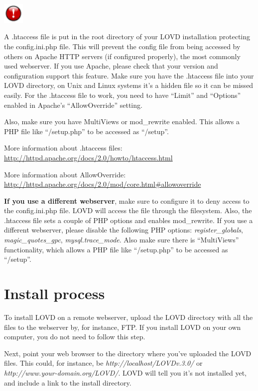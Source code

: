 \documentclass[a4paper,oneside,openany,12pt]{memoir}
\newlength{\infoboxlength}
\newlength{\infoboxinnerlength}
\newenvironment{warntable}
  {\begin{lrbox}{\infobox}%
    \begin{minipage}[t]{1.5cm}
      \centering
      \vspace{0pt}
      \includegraphics[width=1cm,height=1cm]{lovd_warning.png}
    \end{minipage}
   \begin{minipage}[t]{\infoboxlength}\vspace{5pt}\begin{minipage}{\infoboxinnerlength}}
  {\vspace{6pt}\end{minipage}\end{minipage}\end{lrbox}%
   \begin{center}
   \fcolorbox{black}{LOVDlight}{\usebox{\infobox}}
   \end{center}}
\begin{document}
\begin{warntable}
A .htaccess file is put in the root directory of your LOVD installation protecting the config.ini.php file.
This will prevent the config file from being accessed by others on Apache HTTP servers (if configured properly), the most commonly used webserver.
If you use Apache, please check that your version and configuration support this feature.
Make sure you have the .htaccess file into your LOVD directory, on Unix and Linux systems it's a hidden file so it can be missed easily.
For the .htaccess file to work, you need to have ``Limit'' and ``Options'' enabled in Apache's ``AllowOverride'' setting.
\par
Also, make sure you have MultiViews or mod\_rewrite enabled.
This allows a PHP file like ``/setup.php'' to be accessed as ``/setup''.
\\
\par
\noindent
More information about .htaccess files:\\
\url{http://httpd.apache.org/docs/2.0/howto/htaccess.html}
\\
\par
\noindent
More information about AllowOverride:\\
\url{http://httpd.apache.org/docs/2.0/mod/core.html\#allowoverride}
\\
\par
\textbf{If you use a different webserver}, make sure to configure it to deny access to the config.ini.php file.
LOVD will access the file through the filesystem.
Also, the .htaccess file sets a couple of PHP options and enables mod\_rewrite.
If you use a different webserver, please disable the following PHP options: \emph{register\_globals}, \emph{magic\_quotes\_gpc}, \emph{mysql.trace\_mode}.
Also make sure there is ``MultiViews'' functionality, which allows a PHP file like ``/setup.php'' to be accessed as ``/setup''.%
\end{warntable}





\section{Install process}
To install LOVD on a remote webserver, upload the LOVD directory with all the files to the webserver by, for instance, FTP.
If you install LOVD on your own computer, you do not need to follow this step.
\\
\par
Next, point your web browser to the directory where you've uploaded the LOVD files.
This could, for instance, be \emph{http://localhost/LOVDv.3.0/} or \emph{http://www.your-domain.org/LOVD/}.
LOVD will tell you it's not installed yet, and include a link to the install directory.
\end{document}
